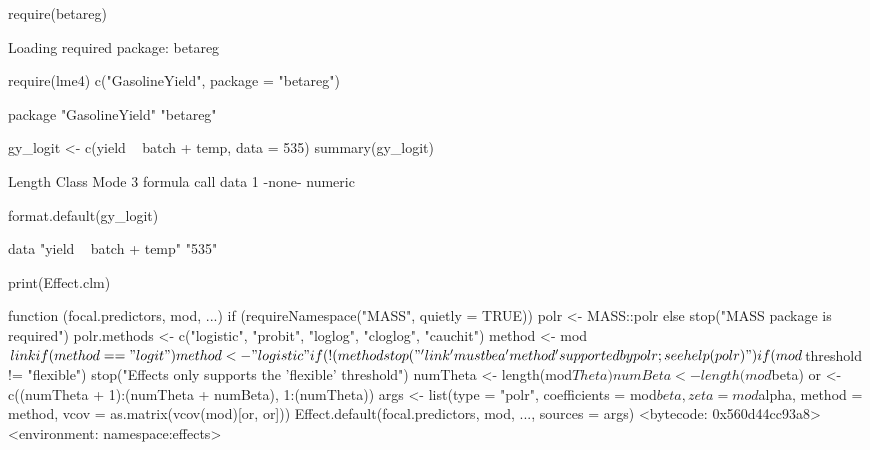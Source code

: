\documentclass[
]{article}
\begin{document}
\begin{Schunk}
\begin{Sinput}
 require(betareg)
\end{Sinput}
\begin{Soutput}
Loading required package: betareg
\end{Soutput}
\begin{Sinput}
 require(lme4)
 c("GasolineYield", package = "betareg")
\end{Sinput}
\begin{Soutput}
                        package 
"GasolineYield"       "betareg" 
\end{Soutput}
\begin{Sinput}
 gy_logit <- c(yield ~ batch + temp, data = 535)
 summary(gy_logit)
\end{Sinput}
\begin{Soutput}
     Length Class   Mode   
     3      formula call   
data 1      -none-  numeric
\end{Soutput}
\begin{Sinput}
 format.default(gy_logit)
\end{Sinput}
\begin{Soutput}
                                         data 
"yield ~ batch + temp"                  "535" 
\end{Soutput}
\end{Schunk}
\begin{Schunk}
\begin{Sinput}
 print(Effect.clm)
\end{Sinput}
\begin{Soutput}
function (focal.predictors, mod, ...) 
{
    if (requireNamespace("MASS", quietly = TRUE)) {
        polr <- MASS::polr
    }
    else stop("MASS package is required")
    polr.methods <- c("logistic", "probit", "loglog", "cloglog", 
        "cauchit")
    method <- mod$link
    if (method == "logit") 
        method <- "logistic"
    if (!(method %in% polr.methods)) 
        stop("'link' must be a 'method' supported by polr; see help(polr)")
    if (mod$threshold != "flexible") 
        stop("Effects only supports the 'flexible' threshold")
    numTheta <- length(mod$Theta)
    numBeta <- length(mod$beta)
    or <- c((numTheta + 1):(numTheta + numBeta), 1:(numTheta))
    args <- list(type = "polr", coefficients = mod$beta, zeta = mod$alpha, 
        method = method, vcov = as.matrix(vcov(mod)[or, or]))
    Effect.default(focal.predictors, mod, ..., sources = args)
}
<bytecode: 0x560d44cc93a8>
<environment: namespace:effects>
\end{Soutput}
\end{Schunk}
\end{document}
